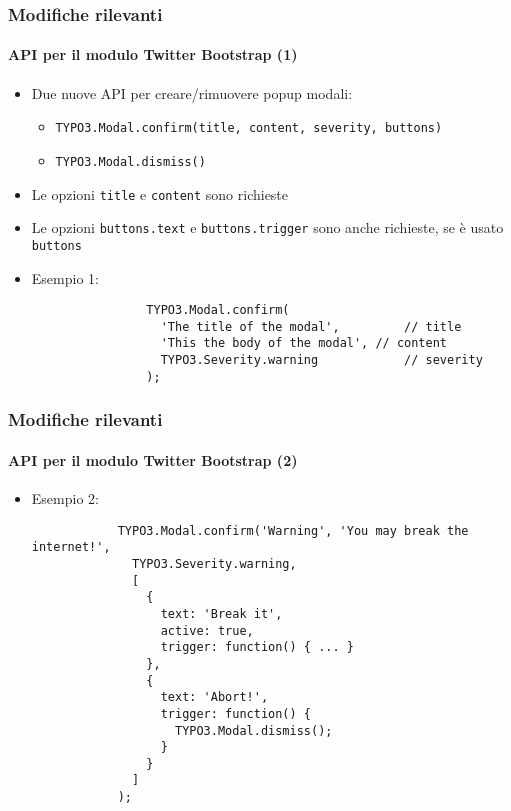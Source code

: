 \begin{frame}[fragile]
	\frametitle{Modifiche rilevanti}
	\framesubtitle{API per il modulo Twitter Bootstrap (1)}

	\lstset{basicstyle=\smaller\ttfamily}

	\begin{itemize}

		\item Due nuove API per creare/rimuovere popup modali:
			\begin{itemize}
				\item \texttt{TYPO3.Modal.confirm(title, content, severity, buttons)}
				\item \texttt{TYPO3.Modal.dismiss()}
			\end{itemize}

		\item Le opzioni \texttt{title} e \texttt{content} sono richieste
		\item Le opzioni \texttt{buttons.text} e \texttt{buttons.trigger} sono anche richieste, se è usato \texttt{buttons}

		\item Esempio 1:

			\begin{lstlisting}
				TYPO3.Modal.confirm(
				  'The title of the modal',         // title
				  'This the body of the modal', // content
				  TYPO3.Severity.warning            // severity
				);
			\end{lstlisting}

	\end{itemize}

\end{frame}


\begin{frame}[fragile]
	\frametitle{Modifiche rilevanti}
	\framesubtitle{API per il modulo Twitter Bootstrap (2)}

	\begin{itemize}

		\item Esempio 2:

		\begin{lstlisting}
			TYPO3.Modal.confirm('Warning', 'You may break the internet!',
			  TYPO3.Severity.warning,
			  [
			    {
			      text: 'Break it',
			      active: true,
			      trigger: function() { ... }
			    },
			    {
			      text: 'Abort!',
			      trigger: function() {
			        TYPO3.Modal.dismiss();
			      }
			    }
			  ]
			);
		\end{lstlisting}

	\end{itemize}

\end{frame}

